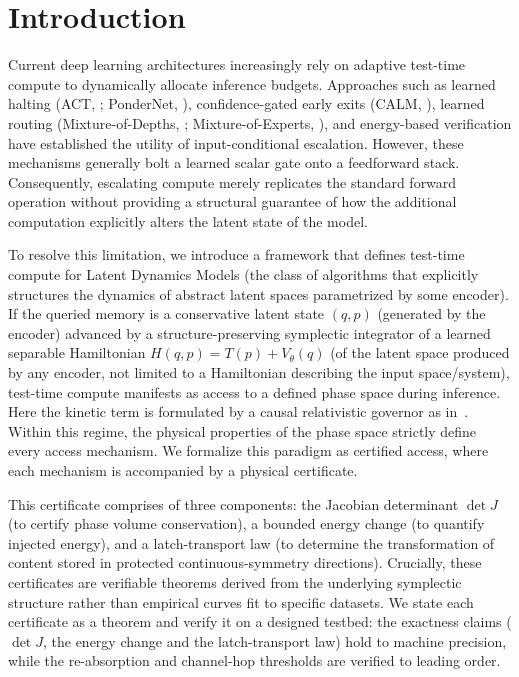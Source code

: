 \documentclass{article}
\newcommand{\detJ}{\det J}
\begin{document}
\section{Introduction}
Current deep learning architectures increasingly rely on adaptive test-time compute to dynamically allocate inference budgets. Approaches such as learned halting (ACT, \citealp{graves_adaptive_2017}; PonderNet, \citealp{banino_pondernet_2021}), confidence-gated early exits (CALM, \citealp{schuster_confident_2022}), learned routing (Mixture-of-Depths, \citealp{raposo_mixture--depths_2024}; Mixture-of-Experts, \citealp{shazeer_outrageously_2017}), and energy-based verification \citep{gladstone_energy-based_2025} have established the utility of input-conditional escalation. However, these mechanisms generally bolt a learned scalar gate onto a feedforward stack. Consequently, escalating compute merely replicates the standard forward operation without providing a structural guarantee of how the additional computation explicitly alters the latent state of the model.

To resolve this limitation, we introduce a framework that defines test-time compute for Latent Dynamics Models (the class of algorithms that explicitly structures the dynamics of abstract latent spaces parametrized by some encoder). If the queried memory is a conservative latent state $(q,p)$ (generated by the encoder) advanced by a structure-preserving symplectic integrator of a learned separable Hamiltonian $H(q,p)=T(p)+V_\theta(q)$ (of the latent space produced by any encoder, not limited to a Hamiltonian describing the input space/system), test-time compute manifests as access to a defined phase space during inference. Here the kinetic term is formulated by a causal relativistic governor as in~\citet{jawahar_chlu_2026}. Within this regime, the physical properties of the phase space strictly define every access mechanism. We formalize this paradigm as certified access, where each mechanism is accompanied by a physical certificate.

This certificate comprises of three components: the Jacobian determinant $\detJ$ (to certify phase volume conservation), a bounded energy change (to quantify injected energy), and a latch-transport law (to determine the transformation of content stored in protected continuous-symmetry directions). Crucially, these certificates are verifiable theorems derived from the underlying symplectic structure rather than empirical curves fit to specific datasets. We state each certificate as a theorem and verify it on a designed testbed: the exactness claims ($\det J$, the energy change and the latch-transport law) hold to machine precision, while the re-absorption and channel-hop thresholds are verified to leading order.
\end{document}
